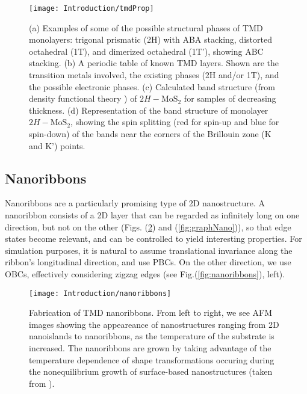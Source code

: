 \begin{figure}[H]
\centering
\texttt{[image: Introduction/tmdProp]}
 \caption[Structure and electronic properties of \ac{TMD} monolayers.]{(a) Examples of some of the possible structural phases of \ac{TMD} monolayers: trigonal prismatic (2H) with ABA stacking, distorted octahedral (1T), and dimerized octahedral (1T'), showing ABC stacking. (b) A periodic table of known \ac{TMD} layers. Shown are the transition metals involved, the existing phases (2H and/or 1T), and the possible electronic phases. (c) Calculated band structure (from density functional theory \cite{splendiani_emerging_2010} ) of $2H-\text{Mo}\text{S}_2$ for samples of decreasing thickness. (d) Representation of the band structure of monolayer $2H-\text{Mo}\text{S}_2$, showing the spin splitting (red for spin-up and blue for spin-down) of the bands near the corners of the Brillouin zone (K and K') points. \label{fig:tmdProp}}
\end{figure}

\subsection{Nanoribbons}\label{subsec:nanoribbons}

Nanoribbons are a particularly promising type of \acs{2D} nanostructure.
A nanoribbon consists of a \ac{2D} layer that can be regarded as infinitely long on one direction, but not on the other (Figs. (\ref{fig:fabrication}) and (\ref{fig:graphNano})), so that edge states become relevant, and can be controlled to yield interesting properties.
For simulation purposes, it is natural to assume translational invariance along the ribbon's longitudinal direction, and use \acp{PBC}.
On the other direction, we use \acp{OBC}, effectively considering zigzag edges (see Fig.(\ref{fig:nanoribbons}), left).

\begin{figure}[H]
\centering
\texttt{[image: Introduction/nanoribbons]}
\caption[Fabrication of \ac{TMD} nanoribbons]{Fabrication of \ac{TMD} nanoribbons. From left to right, we see \ac{AFM} images showing the appeareance of nanostructures ranging from \ac{2D} nanoislands to nanoribbons, as the temperature of the substrate is increased. The nanoribbons are grown by taking advantage of the temperature dependence of shape transformations occuring during the nonequilibrium growth of surface-based nanostructures (taken from \cite{chen_fabrication_2017}).}
\label{fig:fabrication}
\end{figure}

